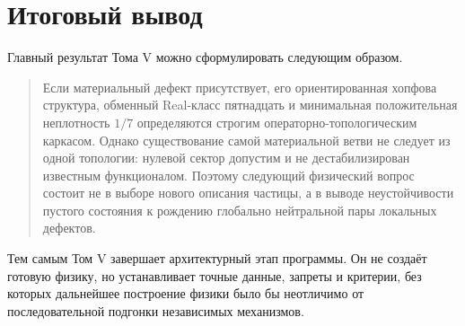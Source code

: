 \section*{Итоговый вывод}

Главный результат Тома V можно сформулировать следующим образом.

\begin{quote}
Если материальный дефект присутствует, его ориентированная хопфова
структура, обменный Real-класс пятнадцать и минимальная положительная
неплотность $1/7$ определяются строгим операторно-топологическим каркасом.
Однако существование самой материальной ветви не следует из одной
топологии: нулевой сектор допустим и не дестабилизирован известным
функционалом. Поэтому следующий физический вопрос состоит не в выборе
нового описания частицы, а в выводе неустойчивости пустого состояния к
рождению глобально нейтральной пары локальных дефектов.
\end{quote}

Тем самым Том V завершает архитектурный этап программы. Он не создаёт
готовую физику, но устанавливает точные данные, запреты и критерии, без
которых дальнейшее построение физики было бы неотличимо от последовательной
подгонки независимых механизмов.